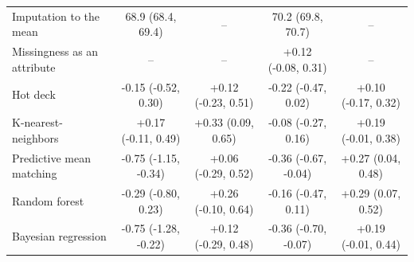 \documentclass{article}
\begin{document}
\begin{table}
\begin{tabular}{lcccc}
\midrule
Imputation to the mean & 68.9 (68.4, 69.4) & -- & 70.2 (69.8, 70.7) & -- \\ 
Missingness as an attribute & -- & -- & +0.12 (-0.08, 0.31) & -- \\ 
Hot deck & -0.15 (-0.52, 0.30) & +0.12 (-0.23, 0.51) & -0.22 (-0.47, 0.02) & +0.10 (-0.17, 0.32) \\ 
K-nearest-neighbors & +0.17 (-0.11, 0.49) & +0.33 (0.09, 0.65) & -0.08 (-0.27, 0.16) & +0.19 (-0.01, 0.38) \\ 
Predictive mean matching & -0.75 (-1.15, -0.34) & +0.06 (-0.29, 0.52) & -0.36 (-0.67, -0.04) & +0.27 (0.04, 0.48) \\ 
Random forest & -0.29 (-0.80, 0.23) & +0.26 (-0.10, 0.64) & -0.16 (-0.47, 0.11) & +0.29 (0.07, 0.52) \\ 
Bayesian regression & -0.75 (-1.28, -0.22) & +0.12 (-0.29, 0.48) & -0.36 (-0.70, -0.07) & +0.19 (-0.01, 0.44) \\ 
\bottomrule
\end{tabular} 
 \end{table}

\clearpage
\end{document}
